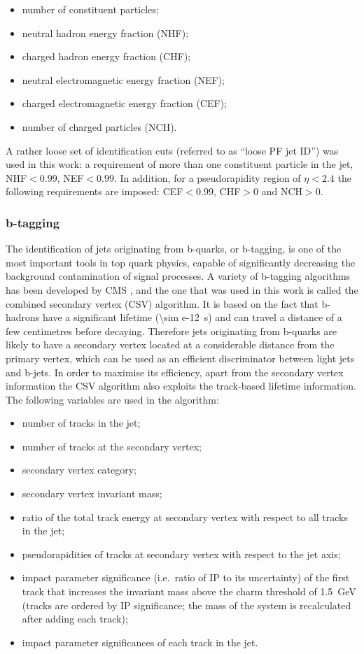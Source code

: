 \begin{itemize}
  \item number of constituent particles;
  \item neutral hadron energy fraction (NHF);
  \item charged hadron energy fraction (CHF);
  \item neutral electromagnetic energy fraction (NEF);
  \item charged electromagnetic energy fraction (CEF);
  \item number of charged particles (NCH).
\end{itemize}

A rather loose set of identification cuts (referred to as ``loose PF jet ID'') was used in this work: a requirement of
more than one constituent particle in the jet, NHF$<0.99$, NEF$<0.99$. In addition, for a pseudorapidity region of
$\eta<2.4$ the following requirements are imposed: CEF$<0.99$, CHF$>0$ and NCH$>0$.

\subsubsection{b-tagging}
\label{sss:b-tagging}
The identification of jets originating from b-quarks, or b-tagging, is one of the  most important tools in top quark
physics, capable of significantly decreasing the background contamination of signal processes. A variety of b-tagging
algorithms has been developed by CMS \autocite{b-tagging_CMS}, and the one that was used in this work is called the
combined secondary vertex (CSV) algorithm. It is based on the fact that b-hadrons have a significant lifetime (\SI{\sim
e-12}{s}) and can travel a distance of a few centimetres before decaying. Therefore jets originating from b-quarks are
likely to have a secondary vertex located at a considerable distance from the primary vertex, which can be used as an
efficient discriminator between light jets and b-jets. In order to maximise its efficiency, apart from the secondary
vertex information the CSV algorithm also exploits the track-based lifetime information. The following variables are
used in the algorithm:
\begin{itemize}
 \item number of tracks in the jet;
 \item number of tracks at the secondary vertex;
 \item secondary vertex category;
 \item secondary vertex invariant mass;
 \item ratio of the total track energy at secondary vertex with respect to all tracks in the jet;
 \item pseudorapidities of tracks at secondary vertex with respect to the jet axis;
 \item impact parameter significance (i.e.\ ratio of IP to its uncertainty) of the first track that increases the
 invariant mass above the charm threshold of \SI{1.5}{\GeV} (tracks are ordered by IP significance; the mass of the
 system is recalculated after adding each track);
 \item impact parameter significances of each track in the jet.
\end{itemize}

